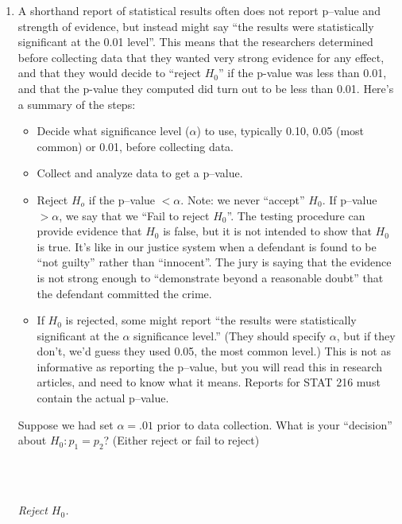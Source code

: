 \begin{enumerate}
\begin{enumerate}
    \item A shorthand report of statistical results often does not
      report p--value and strength of evidence, but instead might say
      ``the results were statistically significant at the 0.01
      level''.  This means that the researchers determined before
      collecting data that they wanted very strong evidence for any
      effect, and that they would decide to ``reject $H_0$'' if the
      p-value was less than 0.01, and that the p-value they computed
      did turn out to be less than 0.01.  Here's a summary of the
      steps:
      \begin{itemize}
      \item Decide what significance level ($\alpha$) to use,
        typically 0.10, 0.05 (most common) or 0.01, before collecting
        data.
      \item Collect and analyze data to get a p--value.
      \item Reject $H_o$ if the p--value $< \alpha$.  Note: we never
        ``accept'' $H_0$. If p--value $>\alpha$, we say that we ``Fail
        to reject $H_0$''.  The testing procedure can provide evidence
        that $H_0$ is false, but it is not intended to show that $H_0$
        is true.  It's like in our justice system when a defendant is
        found to be ``not guilty'' rather than ``innocent''.  The jury
        is saying that the evidence is not strong enough to
        ``demonstrate beyond a reasonable doubt'' that the defendant
        committed the crime.
      \item If $H_0$ is rejected, some might report ``the results were
        statistically significant at the $\alpha$ significance
        level.'' (They should specify $\alpha$, but if they don't,
        we'd guess they used 0.05, the most common level.)
        This is not as informative as reporting the p--value, but you
        will read this in research articles, and need to know what it
        means. Reports for STAT 216  must contain the actual p--value.
      \end{itemize}
      Suppose we had set $\alpha = .01$ prior to data collection. What
      is your ``decision'' about $H_0: p_1 = p_2$?  (Either reject or
      fail to reject) 
\begin{students}
 \ \   \vspace*{1cm}\\
\end{students}
\begin{key}
      \\ {\it Reject $H_0$.}\\

\end{key}
\end{enumerate}
\end{enumerate}
